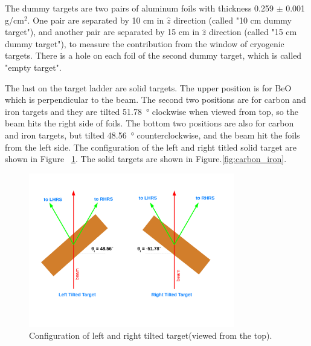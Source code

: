 The dummy targets are two pairs of aluminum foils with thickness 0.259 $\pm$ 0.001 g/cm$^2$.
One pair are separated by 10 cm in $\hat{z}$ direction (called "10 cm dummy target"), and another pair are separated by
15 cm in $\hat{z}$ direction (called "15 cm dummy target"), to measure the contribution from the window
of cryogenic targets.  There is a hole on each foil of the second dummy target, which is called "empty target".

The last on the target ladder are solid targets.
The upper position is for BeO which is perpendicular to the beam.
The second two positions are for carbon and iron targets and they are tilted \SI{51.78}{\degree}
clockwise when viewed from top, so the beam hits the right side of foils.
The bottom two positions are also for carbon and iron targets, but tilted \SI{48.56}{\degree}
counterclockwise, and the beam hit the foils from the left side. The configuration of the left and right titled solid
target are shown in Figure ~\ref{fig:left_right_tilted_target}.
The solid targets are shown in Figure.\ref{fig:carbon_iron}.

\begin{figure}[tb!]
\centering
\includegraphics[width=0.8\textwidth]{figs/left_right_tilted_target.pdf}
\caption[left right tilted target ]{Configuration of left and right tilted target(viewed from the top). }\label{fig:left_right_tilted_target}
\end{figure}

